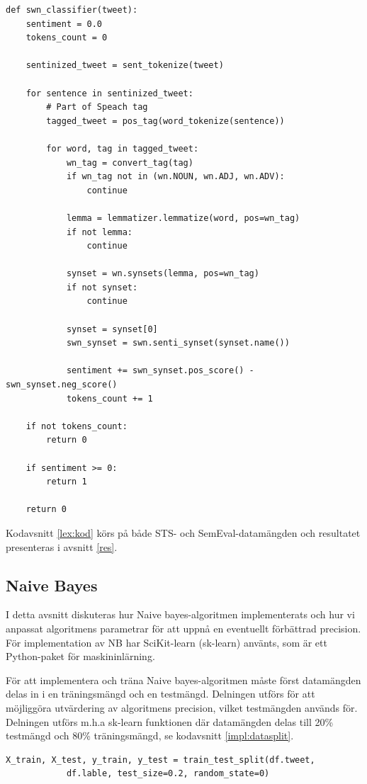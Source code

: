 \documentclass{kaumasters} %
\begin{document}
\begin{lstlisting}[style=mypython,caption={Funktion för att klassificera twitterinlägg m.h.a WordNet och SentiWordNet.},label=lex:kod]
def swn_classifier(tweet):
    sentiment = 0.0
    tokens_count = 0

    sentinized_tweet = sent_tokenize(tweet)

    for sentence in sentinized_tweet:
        # Part of Speach tag
        tagged_tweet = pos_tag(word_tokenize(sentence))

        for word, tag in tagged_tweet:
            wn_tag = convert_tag(tag)
            if wn_tag not in (wn.NOUN, wn.ADJ, wn.ADV):
                continue

            lemma = lemmatizer.lemmatize(word, pos=wn_tag)
            if not lemma:
                continue

            synset = wn.synsets(lemma, pos=wn_tag)
            if not synset:
                continue

            synset = synset[0]
            swn_synset = swn.senti_synset(synset.name())

            sentiment += swn_synset.pos_score() - swn_synset.neg_score()
            tokens_count += 1

    if not tokens_count:
        return 0

    if sentiment >= 0:
        return 1

    return 0
\end{lstlisting}
Kodavsnitt \ref{lex:kod} körs på både STS- och SemEval-datamängden och resultatet presenteras i avsnitt \ref{res}.

\subsection{Naive Bayes}\label{impl:nb}
I detta avsnitt diskuteras hur Naive bayes-algoritmen implementerats och hur vi anpassat algoritmens parametrar för att uppnå en eventuellt förbättrad precision. För implementation av NB har SciKit-learn (sk-learn) \cite{scikit:002} använts, som är ett Python-paket för maskininlärning.

För att implementera och träna Naive bayes-algoritmen måste först datamängden delas in i en träningsmängd och en testmängd. Delningen utförs för att möjliggöra utvärdering av algoritmens precision, vilket testmängden används för. Delningen utförs m.h.a sk-learn funktionen  \cite{scikit:003} där datamängden delas till 20\% testmängd och 80\% träningsmängd, se kodavsnitt \ref{impl:datasplit}.
\begin{lstlisting}[style=mypython,caption={Kod för att dela upp datamängden i en träningsmängd och en testmängd.},label=impl:datasplit]
X_train, X_test, y_train, y_test = train_test_split(df.tweet,
            df.lable, test_size=0.2, random_state=0)
\end{lstlisting}
\end{document}

